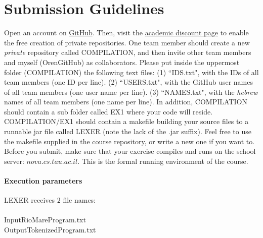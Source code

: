 \documentclass{article}
\begin{document}
\section{Submission Guidelines}
Open an account on \href{https://github.com/}{GitHub}.
Then, visit the
\href{https://education.github.com/discount_requests/new}{academic discount page}
to enable the free creation of private repositories.
One team member should create a new \textit{private} repository called COMPILATION,
and then invite other team members and myself (OrenGitHub)
as collaborators.
Please put inside the uppermost folder (COMPILATION) the following text files:
(1) ``IDS.txt", with the IDs of all team members (one ID per line).
(2) ``USERS.txt", with the GitHub user names of all team members (one user name per line).
(3) ``NAMES.txt", with the \textit{hebrew} names of all team members (one name per line).
In addition, COMPILATION should contain a sub folder called EX1
where your code will reside.
COMPILATION/EX1 should contain a makefile building your source files to a
runnable jar file called LEXER (note the lack of the .jar suffix).
Feel free to use the makefile supplied in the course repository,
or write a new one if you want to. 
Before you submit, make sure that your exercise compiles and runs
on the school server: $nova.cs.tau.ac.il$.
This is the formal running environment of the course.
\paragraph{Execution parameters}
LEXER receives $2$ file names:\\ \\
InputRioMareProgram.txt\\
OutputTokenizedProgram.txt
\end{document}
